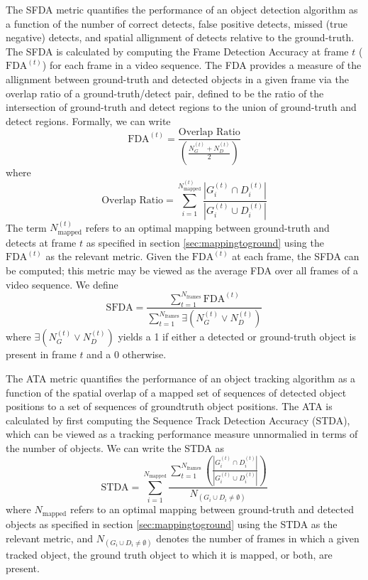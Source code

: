 \documentclass[twocolumn, final]{svjour3}
\begin{document}
The SFDA metric quantifies the performance of an object detection algorithm as a function of the number of correct detects, false positive detects, missed (true negative) detects, and spatial allignment of detects relative to the ground-truth. The SFDA is calculated by computing the Frame Detection Accuracy at frame $t$ ($\text{FDA}^{(t)}$) for each frame in a video sequence. The FDA provides a measure of the allignment between ground-truth and detected objects in a given frame via the overlap ratio of a ground-truth/detect pair, defined to be the ratio of the intersection of ground-truth and detect regions to the union of ground-truth and detect regions. Formally, we can write
\begin{equation}
\text{FDA}^{(t)} = \frac{\text{Overlap Ratio}}{\left(\frac{N_{G}^{(t)} + N_{D}^{(t)}}{2}\right)}
\end{equation}
where
\begin{equation}
\text{Overlap Ratio} = \sum_{i = 1}^{N_{\text{mapped}}^{(t)}} \frac{\left|G_{i}^{(t)} \cap D_{i}^{(t)}\right|}{\left|G_{i}^{(t)} \cup D_{i}^{(t)}\right|}
\end{equation}
The term $N_{\text{mapped}}^{(t)}$ refers to an optimal mapping between ground-truth and detects at frame $t$ as specified in section \ref{sec:mappingtoground} using the $\text{FDA}^{(t)}$ as the relevant metric. Given the $\text{FDA}^{(t)}$ at each frame, the SFDA can be computed; this metric may be viewed as the average FDA over all frames of a video sequence. We define
\begin{equation}
\text{SFDA} = \frac{\sum_{t=1}^{N_{\text{frames}}} \text{FDA}^{(t)}}{\sum_{t=1}^{N_{\text{frames}}} \exists \left( N_{G}^{(t)} \vee N_{D}^{(t)} \right)}
\end{equation}
where $\exists \left( N_{G}^{(t)} \vee N_{D}^{(t)} \right)$ yields a 1 if either a detected or ground-truth object is present in frame $t$ and a 0 otherwise.

The ATA metric quantifies the performance of an object tracking algorithm as a function of the spatial overlap of a mapped set of sequences of detected object positions to a set of sequences of groundtruth object positions. The ATA is calculated by first computing the Sequence Track Detection Accuracy (STDA), which can be viewed as a tracking performance measure unnormalied in terms of the number of objects. We can write the STDA as
\begin{equation}
\text{STDA} = \sum_{i=1}^{N_{\text{mapped}}} \frac{\sum_{t=1}^{N_{\text{frames}}} \left( \frac{\left|G_{i}^{(t)} \cap D_{i}^{(t)}\right|}{\left|G_{i}^{(t)} \cup D_{i}^{(t)}\right|}  \right) }{ N_{(G_{i} \cup D_{i} \neq \emptyset)} }
\end{equation}
where $N_{\text{mapped}}$ refers to an optimal mapping between ground-truth and detected objects as specified in section \ref{sec:mappingtoground} using the STDA as the relevant metric, and $N_{(G_{i} \cup D_{i} \neq \emptyset)}$ denotes the number of frames in which a given tracked object, the ground truth object to which it is mapped, or both, are present.
\end{document}
